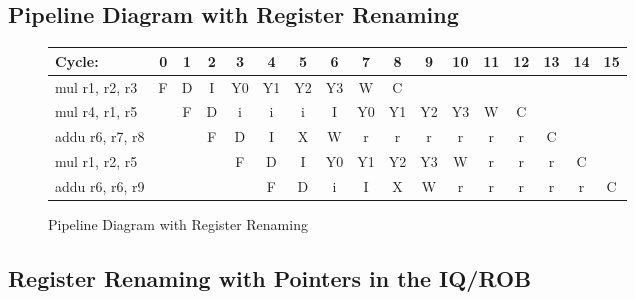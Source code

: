 \documentclass[10pt]{article}
\begin{document}
\subsection{Pipeline Diagram with Register Renaming}

\begin{figure}[H]
\centering
{\setlength{\tabcolsep}{2pt}
\begin{tabular}{|l|c|c|c|c|c|c|c|c|c|c|c|c|c|c|c|c|}
\hline
Cycle:            & 0 & 1 & 2 & 3 & 4 & 5 & 6 & 7 & 8 & 9 & 10 & 11 & 12 & 13 & 14 & 15 \\ \hline
mul  r1, r2, r3   & F & D & I & Y0& Y1& Y2& Y3& W & C &   &    &    &    &    &    &    \\ \hline
mul  r4, r1, r5   &   & F & D & i & i & i & I & Y0& Y1& Y2& Y3 & W  & C  &    &    &    \\ \hline
addu r6, r7, r8   &   &   & F & D & I & X & W & r & r & r & r  & r  & r  & C  &    &    \\ \hline
mul  r1, r2, r5   &   &   &   & F & D & I & Y0& Y1& Y2& Y3& W  & r  & r  & r  & C  &    \\ \hline
addu r6, r6, r9   &   &   &   &   & F & D & i & I & X & W & r  & r  & r  & r  & r  & C  \\ \hline
\end{tabular}
}
\caption{Pipeline Diagram with Register Renaming}
\end{figure}

\subsection{Register Renaming with Pointers in the IQ/ROB}
\end{document}

